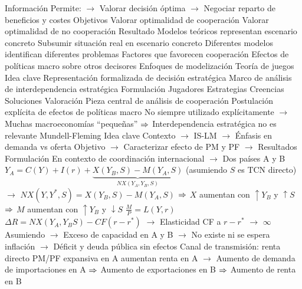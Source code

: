 \documentclass{nuevotema}
\begin{document}
\begin{esquemal}
				\4 Información
				\4[] Permite:
				\4[] $\to$ Valorar decisión óptima
				\4[] $\to$ Negociar reparto de beneficios y costes
			\3 Objetivos
				\4 Valorar optimalidad de cooperación
				\4 Valorar optimalidad de no cooperación
			\3 Resultado
				\4 Modelos teóricos representan escenario concreto
				\4 Subsumir situación real en escenario concreto
				\4 Diferentes modelos identifican diferentes problemas
				\4[] Factores que favorecen cooperación
				\4[] Efectos de políticas macro sobre otros decisores
		\2 Enfoques de modelización
			\3 Teoría de juegos
				\4 Idea clave
				\4[] Representación formalizada de decisión estratégica
				\4[] Marco de análisis de interdependencia estratégica
				\4 Formulación
				\4[] Jugadores
				\4[] Estrategias
				\4[] Creencias
				\4[] Soluciones
				\4 Valoración
				\4[] Pieza central de análisis de cooperación
				\4[] Postulación explícita de efectos de políticas macro
				\4[] No siempre utilizado explícitamente
				\4[] $\to$ Muchas macroeconomías ``pequeñas''
				\4[] $\Rightarrow$ Interdependencia estratégica no es relevante
			\3 Mundell-Fleming
				\4 Idea clave
				\4[] Contexto
				\4[] $\to$ IS-LM
				\4[] $\to$ Énfasis en demanda vs oferta
				\4[] Objetivo
				\4[] $\to$ Caracterizar efecto de PM y PF
				\4[] $\to$
				\4[] Resultados
				\4 Formulación
				\4[] En contexto de coordinación internacional
				\4[] $\to$ Dos países A y B
				\4[] $Y_A = C(Y) + I(r) + \underbrace{X(Y_B,S) - M(Y_A, S)}_{NX(Y_A,Y_B,S)}$
				\4[] (asumiendo $S$ es TCN directo)
				\4[] $\to$ $NX(Y,Y^*,S) = X(Y_B, S) - M(Y_A,S)$
				\4[] $\Rightarrow$ $X$ aumentan con $\uparrow Y_B$ y $\uparrow S$
				\4[] $\Rightarrow$ $M$ aumentan con $\uparrow Y_B$ y $\downarrow S$
				\4[] $\frac{M}{P} = L(Y,r)$
				\4[] $ \Delta R = NX (Y_A, Y_BS) - CF(r - r^*)$
				\4[] $\to$ Elasticidad CF a $r-r^*$ $\to$ $\infty$
				\4[] Asumiendo
				\4[] $\to$ Exceso de capacidad en A y B
				\4[] $\to$ No existe ni se espera inflación
				\4[] $\to$ Déficit y deuda pública sin efectos
				\4 Canal de transmisión: renta directo
				\4[] PM/PF expansiva en A aumentan renta en A
				\4[] $\to$ Aumento de demanda de importaciones en A
				\4[] $\Rightarrow$ Aumento de exportaciones en B
				\4[] $\Rightarrow$ Aumento de renta en B


\end{esquemal}
\end{document}
